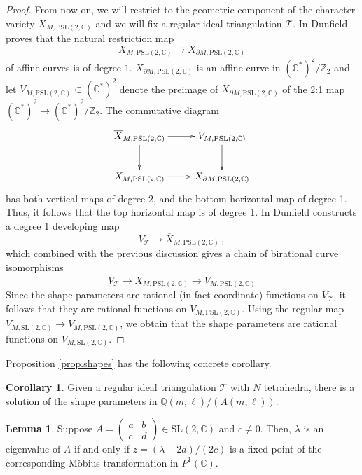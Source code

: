 \documentclass[12pt]{amsart}
\newcommand{\lbl}{\label}
\theoremstyle{definition}
\newtheorem{lemma}[theorem]{Lemma}
\newtheorem{corollary}[theorem]{Corollary}
\def\BZ{\mathbb Z}
\def\BQ{\mathbb Q}
\def\BC{\mathbb C}
\def\longto{\longrightarrow}
\def\SL{\mathrm{SL}}
\def\PSL{\mathrm{PSL}}
\def\pt{\partial}
\def\be{  \begin{equation} }
\def\ee{  \end{equation} }
\def\cxymatrix#1{\xy*[c]\xybox{\xymatrix#1}\endxy}
\newcommand{\CT}{\mathcal{T}}
\numberwithin{equation}{section}
\begin{document}
\begin{proof}
From now on, we will restrict to the geometric component of the character
variety $X_{M,\PSL(2,\BC)}$ and we will fix a regular ideal triangulation
$\CT$. In \cite[Thm.3.1]{Dn} Dunfield proves that the natural restriction
map
$$
X_{M,\PSL(2,\BC)} \longto X_{\pt M,\PSL(2,\BC)}
$$
of affine curves is of degree $1$. 
$X_{\pt M,\PSL(2,\BC)}$ is an affine curve in $(\BC^*)^2/\BZ_2$
and let $V_{M,\PSL(2,\BC)} \subset (\BC^*)^2$ denote the preimage of 
$X_{\pt M,\PSL(2,\BC)}$ of the 2:1 map $(\BC^*)^2 \longto (\BC^*)^2/\BZ_2$. 
The commutative diagram
\begin{equation}
\label{eqn:diagram}
\cxymatrix{{{\overline{X}_{M,\PSL(2,\BC)} }\ar[r]\ar[d]
&V_{M,\PSL(2,\BC)}
\ar[d]
\\
{X_{M,\PSL(2,\BC)}}\ar[r]
&{X_{\pt M,\PSL(2,\BC)}}}}
\end{equation}
has both vertical maps of degree 2, and the bottom horizontal map of
degree 1. Thus, it follows that the top horizontal map is of degree 1.
In \cite[Sec.10.3]{BDR-V} Dunfield constructs a degree 1 developing map
$$
V_{\CT} \longto \overline{X}_{M,\PSL(2,\BC)} \,,
$$
which combined with the previous discussion gives a chain of birational
curve isomorphisms
\be
\lbl{eq.3curves}
V_{\CT} \longto \overline{X}_{M,\PSL(2,\BC)} \longto V_{M,\PSL(2,\BC)}
\ee
Since the shape parameters are rational (in fact coordinate) functions on 
$V_{\CT}$, it follows that they are rational functions on $V_{M,\PSL(2,\BC)}$.
Using the regular map $V_{M,\SL(2,\BC)} \longto V_{M,\PSL(2,\BC)}$, we obtain
that the shape parameters are rational functions on $V_{M,\SL(2,\BC)}$.
\end{proof}

Proposition \ref{prop.shapes} has the following concrete corollary.

\begin{corollary}
\lbl{cor.zML}
Given a regular ideal triangulation $\CT$ with $N$ tetrahedra, there is
a solution of the shape parameters in $\BQ(m,\ell)/(A(m,\ell))$.
\end{corollary}


\begin{lemma}
\lbl{lem.eigen}
Suppose $A=\left(\begin{matrix}a & b \\ c & d \end{matrix}\right) \in 
\SL(2,\BC)$ and $c \neq 0$. Then, $\lambda$ is an eigenvalue of $A$ if and 
only if $z=(\lambda-2d)/(2c)$ is a fixed point of the corresponding M\"obius
transformation in $P^1(\BC)$.
\end{lemma}
\end{document}
